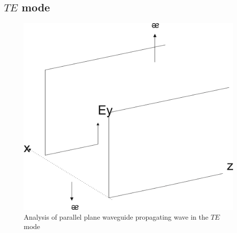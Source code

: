 \subsection{$TE$ mode}
\begin{figure}[h]
\centering
\includegraphics[width=.7\linewidth]{./graphics/WATSON4}
\caption{Analysis of parallel plane waveguide propagating wave in the $TE$ mode}
\end{figure}

